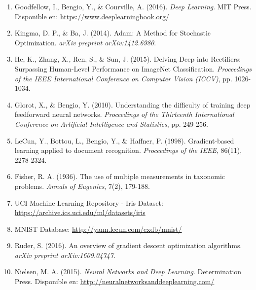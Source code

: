 \documentclass[a4paper,11pt]{article}
\begin{document}
\begin{enumerate}
    \item Goodfellow, I., Bengio, Y., \& Courville, A. (2016). \textit{Deep Learning}. MIT Press. Disponible en: \url{https://www.deeplearningbook.org/}
    
    \item Kingma, D. P., \& Ba, J. (2014). Adam: A Method for Stochastic Optimization. \textit{arXiv preprint arXiv:1412.6980}.
    
    \item He, K., Zhang, X., Ren, S., \& Sun, J. (2015). Delving Deep into Rectifiers: Surpassing Human-Level Performance on ImageNet Classification. \textit{Proceedings of the IEEE International Conference on Computer Vision (ICCV)}, pp. 1026-1034.
    
    \item Glorot, X., \& Bengio, Y. (2010). Understanding the difficulty of training deep feedforward neural networks. \textit{Proceedings of the Thirteenth International Conference on Artificial Intelligence and Statistics}, pp. 249-256.
    
    \item LeCun, Y., Bottou, L., Bengio, Y., \& Haffner, P. (1998). Gradient-based learning applied to document recognition. \textit{Proceedings of the IEEE}, 86(11), 2278-2324.
    
    \item Fisher, R. A. (1936). The use of multiple measurements in taxonomic problems. \textit{Annals of Eugenics}, 7(2), 179-188.
    
    \item UCI Machine Learning Repository - Iris Dataset: \url{https://archive.ics.uci.edu/ml/datasets/iris}
    
    \item MNIST Database: \url{http://yann.lecun.com/exdb/mnist/}
    
    \item Ruder, S. (2016). An overview of gradient descent optimization algorithms. \textit{arXiv preprint arXiv:1609.04747}.
    
    \item Nielsen, M. A. (2015). \textit{Neural Networks and Deep Learning}. Determination Press. Disponible en: \url{http://neuralnetworksanddeeplearning.com/}
\end{enumerate}
\end{document}
